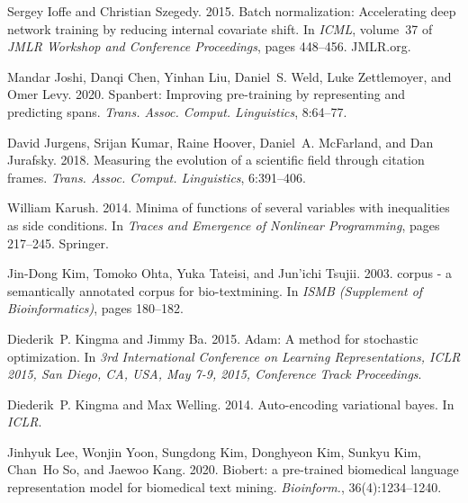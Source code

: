 \documentclass[11pt]{article}
\begin{document}
\begin{thebibliography}{59}
Sergey Ioffe and Christian Szegedy. 2015.
\newblock Batch normalization: Accelerating deep network training by reducing
  internal covariate shift.
\newblock In \emph{{ICML}}, volume~37 of \emph{{JMLR} Workshop and Conference
  Proceedings}, pages 448--456. JMLR.org.

Mandar Joshi, Danqi Chen, Yinhan Liu, Daniel~S. Weld, Luke Zettlemoyer, and
  Omer Levy. 2020.
\newblock Spanbert: Improving pre-training by representing and predicting
  spans.
\newblock \emph{Trans. Assoc. Comput. Linguistics}, 8:64--77.

David Jurgens, Srijan Kumar, Raine Hoover, Daniel~A. McFarland, and Dan
  Jurafsky. 2018.
\newblock Measuring the evolution of a scientific field through citation
  frames.
\newblock \emph{Trans. Assoc. Comput. Linguistics}, 6:391--406.

William Karush. 2014.
\newblock Minima of functions of several variables with inequalities as side
  conditions.
\newblock In \emph{Traces and Emergence of Nonlinear Programming}, pages
  217--245. Springer.

Jin{-}Dong Kim, Tomoko Ohta, Yuka Tateisi, and Jun'ichi Tsujii. 2003.
 corpus - a semantically annotated corpus for bio-textmining.
\newblock In \emph{{ISMB} (Supplement of Bioinformatics)}, pages 180--182.

Diederik~P. Kingma and Jimmy Ba. 2015.
\newblock Adam: {A} method for stochastic optimization.
\newblock In \emph{3rd International Conference on Learning Representations,
  {ICLR} 2015, San Diego, CA, USA, May 7-9, 2015, Conference Track
  Proceedings}.

Diederik~P. Kingma and Max Welling. 2014.
\newblock Auto-encoding variational bayes.
\newblock In \emph{{ICLR}}.

Jinhyuk Lee, Wonjin Yoon, Sungdong Kim, Donghyeon Kim, Sunkyu Kim, Chan~Ho So,
  and Jaewoo Kang. 2020.
\newblock Biobert: a pre-trained biomedical language representation model for
  biomedical text mining.
\newblock \emph{Bioinform.}, 36(4):1234--1240.


\end{thebibliography}
\end{document}
